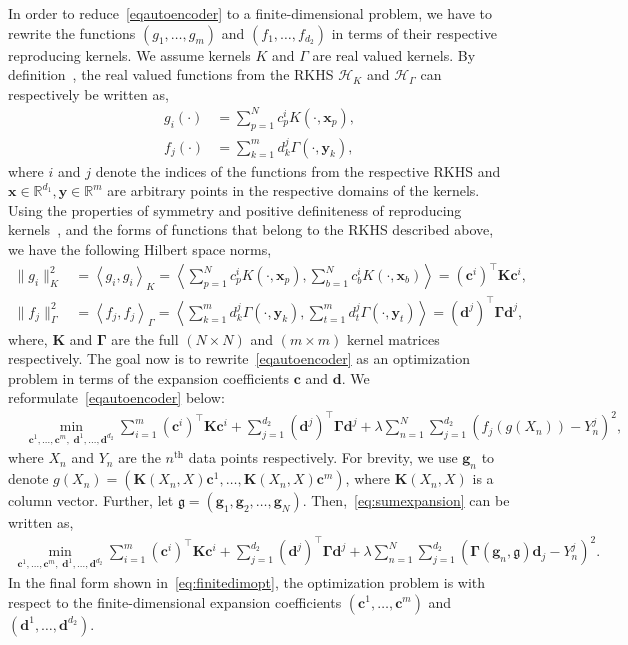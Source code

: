 \documentclass[12pt]{exam}
\def\R{\mathbb{R}}
\def\bx{\mathbf{x}}
\def\by{\mathbf{y}}
\def\bc{\mathbf{c}}
\def\bd{\mathbf{d}}
\def\bg{\mathbf{g}}
\def\H{\mathcal{H}}
\def\Td{\top}
\begin{document}
\begin{questions}
In order to reduce~\eqref{eqautoencoder} to a finite-dimensional problem, we have to rewrite the functions $(g_1,\dots,g_m)$ and $(f_1,\dots,f_{d_2})$ in terms of their respective reproducing kernels. We assume kernels $K$ and $\Gamma$ are real valued kernels. By definition~\citep[Chapter 2.3]{fasshauer2015kernel}, the real valued functions from the RKHS $\H_K$ and $\H_\Gamma$ can respectively be written as,
\begin{align}
g_i(\cdot) &= \sum\limits_{p=1}^{N} c^i_p K(\cdot, \bx_p), \\
f_j(\cdot) &= \sum\limits_{k=1}^{m} d^j_k \Gamma(\cdot, \by_k),
\end{align}
where $i$ and $j$ denote the indices of the functions from the respective RKHS and ${\bx \in \R^{d_1}, \by \in \R^m}$ are arbitrary points in the respective domains of the kernels. Using the properties of symmetry and positive definiteness of reproducing kernels~\citep[Chapter 2.3]{fasshauer2015kernel}, and the forms of functions that belong to the RKHS described above, we have the following Hilbert space norms,
\begin{align}
\|g_i\|_K^2 &= \left\langle g_i, g_i \right\rangle_K = \left\langle \sum\limits_{p=1}^{N} c^i_p K(\cdot, \bx_p), \sum\limits_{b=1}^{N} c^i_b K(\cdot, \bx_b) \right\rangle =  (\bc^i)^\Td \mathbf{K} \bc^i, \\
\|f_j\|_\Gamma^2 &= \left\langle f_j, f_j \right\rangle_{\Gamma} = \left\langle \sum\limits_{k=1}^{m} d^j_k \Gamma(\cdot, \by_k), \sum\limits_{t=1}^{m} d^j_t \Gamma(\cdot, \by_t) \right\rangle =  (\bd^j)^\Td \mathbf{\Gamma} \bd^j,
\end{align}
where, $\mathbf{K}$ and $\mathbf{\Gamma}$ are the full $(N\times N)$ and $(m\times m)$ kernel matrices respectively. The goal now is to rewrite~\eqref{eqautoencoder} as an optimization problem in terms of the expansion coefficients $\bc$ and $\bd$. We reformulate~\eqref{eqautoencoder} below:
\begin{align}
&\min_{\bc^1,\ldots,\bc^m,\; \bd^1,\ldots,\bd^{d_2}} 
\sum_{i=1}^m (\bc^i)^\Td \mathbf{K} \bc^i
+ \sum_{j=1}^{d_2} (\bd^j)^\Td \mathbf{\Gamma} \bd^j
+ \lambda \sum\limits_{n=1}^N \sum\limits_{j=1}^{d_2} \left( f_j(g(X_n)) - Y^j_n \right)^2, \label{eq:sumexpansion}
\end{align}
where $X_n$ and $Y_n$ are the $n^{\text{th}}$ data points respectively. For brevity, we use $\bg_n$ to denote $g(X_n) = \left(\mathbf{K}(X_n, X) \bc^1, \dots, \mathbf{K}(X_n, X) \bc^m \right)$, where $\mathbf{K}(X_n, X)$ is a column vector. Further, let $\mathfrak{g} = (\bg_1, \bg_2, \dots, \bg_N)$. Then,~\eqref{eq:sumexpansion} can be written as,
\begin{align}
\min_{\bc^1,\ldots,\bc^m,\; \bd^1,\ldots,\bd^{d_2}} 
\sum_{i=1}^m (\bc^i)^\Td \mathbf{K} \bc^i
+ \sum_{j=1}^{d_2} (\bd^j)^\Td \mathbf{\Gamma} \bd^j
+ \lambda \sum\limits_{n=1}^N \sum\limits_{j=1}^{d_2} \left( \mathbf{\Gamma}(\bg_n, \mathfrak{g}) \bd_j - Y^j_n \right)^2. \label{eq:finitedimopt}
\end{align}
In the final form shown in~\eqref{eq:finitedimopt}, the optimization problem is with respect to the finite-dimensional expansion coefficients $(\bc^1, \dots, \bc^m)$ and $(\bd^1, \dots, \bd^{d_2})$.
%
\pagebreak


\end{questions}
\end{document}
